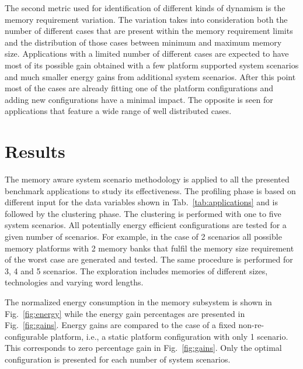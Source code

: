 \documentclass[a4paper,conference]{IEEEtran}
\begin{document}
The second metric used for identification of different kinds of dynamism is the memory requirement variation. The variation takes into consideration both the number of different cases that are present within the memory requirement limits and the distribution of those cases between minimum and maximum memory size. Applications with a limited number of different cases are expected to have most of its possible gain obtained with a few platform supported system scenarios and much smaller energy gains from additional system scenarios. After this point most of the cases are already fitting one of the platform configurations and adding new configurations have a minimal impact. The opposite is seen for applications that feature a wide range of well distributed cases.

\section{Results}
\label{sec:results}

The memory aware system scenario methodology is applied to all the presented benchmark applications to study its effectiveness. The profiling phase is based on different input for the data variables shown in Tab.~\ref{tab:applications} and is followed by the clustering phase. The clustering is performed with one to five system scenarios. All potentially energy efficient configurations are tested for a given number of scenarios. For example, in the case of 2 scenarios all possible memory platforms with 2 memory banks that fulfil the memory size requirement of the worst case are generated and tested. The same procedure is performed for 3, 4 and 5 scenarios. The exploration includes memories of different sizes, technologies and varying word lengths. 

The normalized energy consumption in the memory subsystem is shown in Fig.~\ref{fig:energy} while the energy gain percentages are presented in Fig.~\ref{fig:gains}. 
Energy gains are compared to the case of a fixed non-re-configurable platform, i.e., a static platform configuration with only 1 scenario. This corresponds to zero percentage gain in Fig.~\ref{fig:gains}. Only the optimal configuration is presented for each number of system scenarios.

\end{document}
